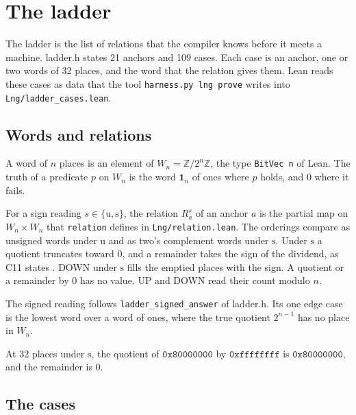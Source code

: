 \chapter{The ladder}
\label{ch:ladder}

The ladder is the list of relations that the compiler knows before it meets a machine. ladder.h states 21
anchors and 109 cases. Each case is an anchor, one or two words of 32 places, and the word that the relation
gives them. Lean reads these cases as data that the tool \texttt{harness.py lng prove} writes into
\texttt{Lng/ladder\_cases.lean}.

\section{Words and relations}

\begin{definition}
A word of $n$ places is an element of $W_n = \mathbb{Z}/2^n\mathbb{Z}$, the type \texttt{BitVec n} of Lean. The
truth of a predicate $p$ on $W_n$ is the word $\mathbf{1}_n$ of ones where $p$ holds, and $0$ where it fails.
\end{definition}

\begin{definition}
For a sign reading $s \in \{\mathrm{u}, \mathrm{s}\}$, the relation $R^{s}_{a}$ of an anchor $a$ is the partial
map on $W_n \times W_n$ that \texttt{relation} defines in \texttt{Lng/relation.lean}. The orderings compare as
unsigned words under $\mathrm{u}$ and as two's complement words under $\mathrm{s}$. Under $\mathrm{s}$ a
quotient truncates toward 0, and a remainder takes the sign of the dividend, as C11 states
\cite{src:c11}. DOWN under $\mathrm{s}$ fills the emptied places with the sign. A quotient or a remainder by 0 has
no value. UP and DOWN read their count modulo $n$.
\end{definition}

The signed reading follows \texttt{ladder\_signed\_answer} of ladder.h. Its one edge case is the lowest word over a
word of ones, where the true quotient $2^{n-1}$ has no place in $W_n$.

\begin{lemma}
At 32 places under $\mathrm{s}$, the quotient of $\mathtt{0x80000000}$ by $\mathtt{0xffffffff}$ is
$\mathtt{0x80000000}$, and the remainder is 0.
\end{lemma}

\section{The cases}

